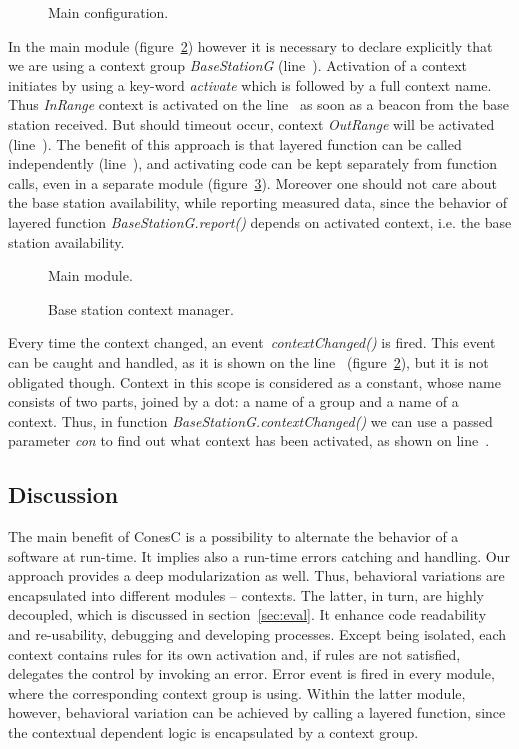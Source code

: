 
\begin{figure}[!h]
\TheSbox
\caption{Main configuration.}
\label{fig:mc}
\end{figure}

In the main module (figure~\ref{fig:mm}) however it is necessary to declare
explicitly that we are using a context group \emph{BaseStationG}
(line~). Activation of a context initiates by using a key-word
\emph{activate} which is followed by a full context name. Thus
\emph{InRange} context is activated on the line~ as soon as a
beacon from the base station received. But should timeout occur, context
\emph{OutRange} will be activated (line~). The benefit of
this approach is that layered function can be called independently
(line~), and activating code can be kept separately from function
calls, even in a separate module (figure~\ref{fig:bscm}).
Moreover one should not care about the base station availability, while
reporting measured data, since the behavior of layered function
\emph{BaseStationG.report()} depends on activated context, i.e. the base
station availability.


\begin{figure}[!h]
\TheSbox
\caption{Main module.}
\label{fig:mm}
\end{figure}


\begin{figure}[!h]
\TheSbox
\caption{Base station context manager.}
\label{fig:bscm}
\end{figure}

Every time the context changed, an event~\emph{contextChanged()} is fired. This event can be
caught and handled, as it is shown on the line~ (figure~\ref{fig:mm}),
but it is not obligated though. Context in this scope is considered as a constant,
whose name consists of two parts, joined by a dot: a name of a group and a name
of a context. Thus, in function \emph{BaseStationG.contextChanged()} we can use
a passed parameter \emph{con} to find out what context has been activated, as
shown on line~.

\subsection{Discussion}

The main benefit of ConesC is a possibility to alternate the behavior of a software at
run-time. It implies also a run-time errors catching and handling. Our approach
provides a deep modularization as well. Thus, behavioral variations are encapsulated
into different modules -- contexts. The latter, in turn, are highly decoupled, which
is discussed in section~\ref{sec:eval}. It enhance code readability and re-usability, debugging
and developing processes. Except being isolated, each context contains rules for its
own activation and, if rules are not satisfied, delegates the control by invoking an error.
Error event is fired in every module, where the corresponding context group is using.
Within the latter module, however, behavioral variation can be achieved by calling a
layered function, since the contextual dependent logic is encapsulated by a context group.
